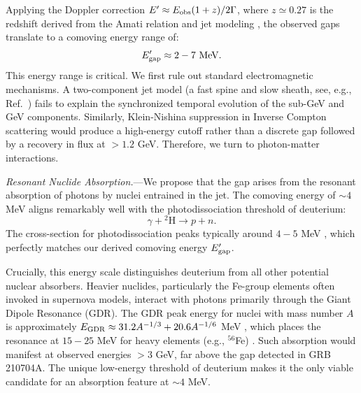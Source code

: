 \documentclass[prd,twocolumn,amsmath,amssymb,aps]{revtex4-2} %
\begin{document}
Applying the Doppler correction $E' \approx E_{\rm obs} (1+z) / 2\Gamma$, where $z \simeq 0.27$ is the redshift derived from the Amati relation and jet modeling \cite{2023MNRAS.522.5204B}, the observed gaps translate to a comoving energy range of:
\begin{equation}
E_{\rm gap}^{\prime} \approx 2 - 7 \text{ MeV}.
\end{equation}
This energy range is critical. We first rule out standard electromagnetic mechanisms. A two-component jet model (a fast spine and slow sheath, see, e.g., Ref.~\cite{2025ApJ...995L...2A}) fails to explain the synchronized temporal evolution of the sub-GeV and GeV components. Similarly, Klein-Nishina suppression in Inverse Compton scattering would produce a high-energy cutoff rather than a discrete gap followed by a recovery in flux at $>1.2$ GeV.
Therefore, we turn to photon-matter interactions.


\textit{Resonant Nuclide Absorption.}---We propose that the gap arises from the resonant absorption of photons by nuclei entrained in the jet. The comoving energy of $\sim 4$ MeV aligns remarkably well with the photodissociation threshold of deuterium:
\begin{equation}
\gamma + {^2\text{H}} \rightarrow p + n.
\end{equation}
The cross-section for photodissociation peaks typically around $4-5$ MeV \cite{IAEA2000}, which perfectly matches our derived comoving energy $E_{\rm gap}^{\prime}$.

Crucially, this energy scale distinguishes deuterium from all other potential nuclear absorbers. Heavier nuclides, particularly the Fe-group elements often invoked in supernova models, interact with photons primarily through the Giant Dipole Resonance (GDR). The GDR peak energy for nuclei with mass number $A$ is approximately $E_{\rm GDR} \approx 31.2 A^{-1/3} + 20.6 A^{-1/6}$ MeV \cite{1975RvMP...47..713B}, which places the resonance at $15-25$ MeV for heavy elements (e.g., $^{56}$Fe) \cite{2020NuDS..163..109K}. Such absorption would manifest at observed energies $>3$ GeV, far above the gap detected in GRB 210704A. The unique low-energy threshold of deuterium makes it the only viable candidate for an absorption feature at $\sim 4$ MeV.
\end{document}

